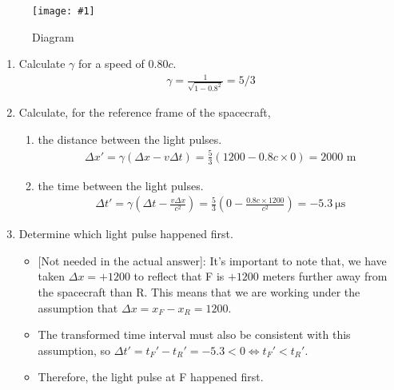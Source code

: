 \documentclass[a4paper,12pt]{article}
\newcommand{\img}[4]{\begin{center}
  \begin{figure}[H]
    \centering
    \texttt{[image: \#1]}
    \caption{#3}
    \label{fig:#4}
  \end{figure}
\end{center}}
\begin{document}
\img{ex/5.png}{0.7}{Diagram}{misc2}

\begin{enumerate}[label=(\alph*)]
  \item Calculate $\gamma$ for a speed of 0.80$c$.
        \begin{align*}
          \gamma = \frac{1}{\sqrt{1 - 0.8^2}} = 5/3
        \end{align*}
  \item Calculate, for the reference frame of the spacecraft,
        \begin{enumerate}[label=(\roman*)]
          \item the distance between the light pulses.
                \begin{align*}
                  \Delta x' = \gamma(\Delta x - v\Delta t) = \frac{5}{3}(1200 - 0.8c\times 0) = 2000  \text{ m}
                \end{align*}
          \item the time between the light pulses.
                \begin{align*}
                  \Delta t' = \gamma(\Delta t - \frac{v\Delta x}{c^2}) = \frac{5}{3}(0 - \frac{0.8c\times 1200}{c^2}) = \qty{-5.3}{\micro\s}
                \end{align*}
        \end{enumerate}
  \item Determine which light pulse happened first.
        \begin{itemize}
          \item {[Not needed in the actual answer]}: It's important to note that, we have taken $\Delta x = +1200$ to reflect that F is $+1200$ meters further away from the spacecraft than R. This means that we are working under the assumption that $\Delta x = x_F - x_R = 1200$.
          \item The transformed time interval must also be consistent with this assumption, so $\Delta t' = t_F' - t_R' = -5.3 < 0 \iff t_F' < t_R'$.
          \item Therefore, the light pulse at F happened first.
        \end{itemize}
\end{enumerate}
\end{document}
